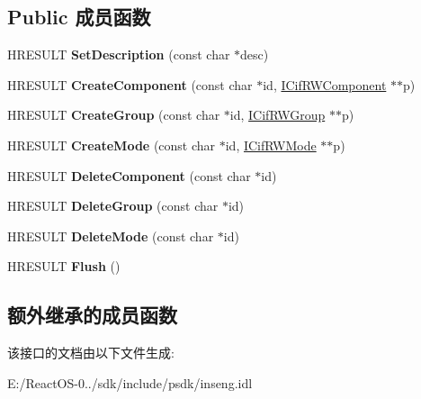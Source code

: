 \subsection*{Public 成员函数}
\begin{DoxyCompactItemize}
\item 
\mbox{\label{interface_i_cif_r_w_file_a40f405104d7b4bb8d435e3898eeefcf6}} 
H\+R\+E\+S\+U\+LT {\bfseries Set\+Description} (const char $\ast$desc)
\item 
\mbox{\label{interface_i_cif_r_w_file_ae41820aefe54c09d2e9b66e20de8aed3}} 
H\+R\+E\+S\+U\+LT {\bfseries Create\+Component} (const char $\ast$id, \hyperlink{interface_i_cif_r_w_component}{I\+Cif\+R\+W\+Component} $\ast$$\ast$p)
\item 
\mbox{\label{interface_i_cif_r_w_file_a2ec010e5f6eecc6a9a37088e2469b4b2}} 
H\+R\+E\+S\+U\+LT {\bfseries Create\+Group} (const char $\ast$id, \hyperlink{interface_i_cif_r_w_group}{I\+Cif\+R\+W\+Group} $\ast$$\ast$p)
\item 
\mbox{\label{interface_i_cif_r_w_file_adc935e94b8f58707241b35cf1bcc6299}} 
H\+R\+E\+S\+U\+LT {\bfseries Create\+Mode} (const char $\ast$id, \hyperlink{interface_i_cif_r_w_mode}{I\+Cif\+R\+W\+Mode} $\ast$$\ast$p)
\item 
\mbox{\label{interface_i_cif_r_w_file_a15940fb28dd2fe522dc4595cb384601c}} 
H\+R\+E\+S\+U\+LT {\bfseries Delete\+Component} (const char $\ast$id)
\item 
\mbox{\label{interface_i_cif_r_w_file_a4cd2e0e3e84983444eb4916a104c6470}} 
H\+R\+E\+S\+U\+LT {\bfseries Delete\+Group} (const char $\ast$id)
\item 
\mbox{\label{interface_i_cif_r_w_file_abb67ea3b9e275eabf0d88eece929f6e8}} 
H\+R\+E\+S\+U\+LT {\bfseries Delete\+Mode} (const char $\ast$id)
\item 
\mbox{\label{interface_i_cif_r_w_file_a85782b815723ddab4202b3d689cc3735}} 
H\+R\+E\+S\+U\+LT {\bfseries Flush} ()
\end{DoxyCompactItemize}
\subsection*{额外继承的成员函数}


该接口的文档由以下文件生成\+:\begin{DoxyCompactItemize}
\item 
E\+:/\+React\+O\+S-\/0../sdk/include/psdk/inseng.\+idl\end{DoxyCompactItemize}
